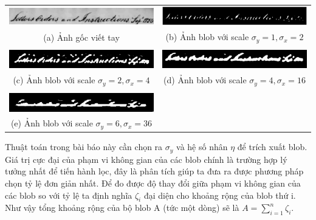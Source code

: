 \documentclass[12pt, a4paper]{article}
\begin{document}
\begin{table}[ht]
\centering
\begin{tabular}{cc}
\includegraphics[scale=0.52]{imgs/a_line_img.png} & \includegraphics[scale=0.52]{imgs/bloby1x2.png} \\
(a) Ảnh gốc viết tay & (b) Ảnh blob với scale $\sigma_y = 1, \sigma_x = 2$ \\\\
\includegraphics[scale=0.52]{imgs/bloby2x4.png} & \includegraphics[scale=0.52]{imgs/bloby4x16.png} \\
(c) Ảnh blob với scale $\sigma_y = 2, \sigma_x = 4$ & (d) Ảnh blob với scale $\sigma_y = 4, \sigma_x = 16$\\\\
\includegraphics[scale=0.52]{imgs/bloby6x36.png}\\
(e) Ảnh blob với scale $\sigma_y = 6, \sigma_x = 36$
\end{tabular}
\label{tab:gt}
\end{table}

Thuật toán trong bài báo này cần chọn ra $\sigma_y$ và hệ số nhân $\eta $ để trích xuất blob. Giá trị cực đại của phạm vi không gian của các blob chính là trường hợp lý tưởng nhất để tiến hành lọc, đây là phân tích giúp ta đưa ra được phương pháp chọn tỷ lệ đơn giản nhất. Để đo được độ thay đổi giữa phạm vi không gian của các blob so với tỷ lệ ta định nghĩa $\zeta_i$ đại diện cho khoảng rộng của blob thứ i. Như vậy tổng khoảng rộng của bộ blob A (tức một dòng) sẽ là $A = \sum_{i = 1}^{n} \zeta_i$.\par
\end{document}
